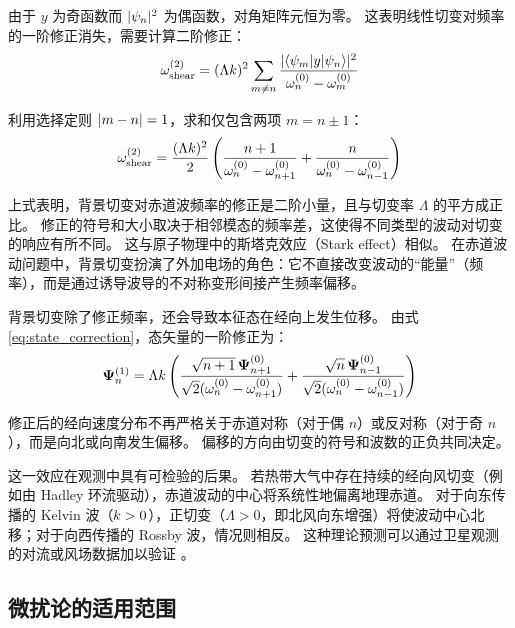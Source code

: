 由于 $y$ 为奇函数而 $\lvert \psi_{n} \rvert^2$ 为偶函数，对角矩阵元恒为零。
这表明线性切变对频率的一阶修正消失，需要计算二阶修正：
\begin{equation}
    \omega^{(2)}_{\mathrm{shear}} = (\Lambda k)^2 \sum_{m \neq n} \frac{\lvert \langle \psi_{m} | y | \psi_{n} \rangle \rvert^2}{\omega_n^{(0)} - \omega_m^{(0)}}
    \label{eq:shear_second_order}
\end{equation}

利用选择定则 $\lvert m - n \rvert = 1$，求和仅包含两项 $m = n \pm 1$：
\begin{equation}
    \omega^{(2)}_{\mathrm{shear}} = \frac{(\Lambda k)^2}{2} \left( \frac{n+1}{\omega_n^{(0)} - \omega_{n+1}^{(0)}} + \frac{n}{\omega_n^{(0)} - \omega_{n-1}^{(0)}} \right)
    \label{eq:shear_explicit}
\end{equation}

上式表明，背景切变对赤道波频率的修正是二阶小量，且与切变率 $\Lambda$ 的平方成正比。
修正的符号和大小取决于相邻模态的频率差，这使得不同类型的波动对切变的响应有所不同。
这与原子物理中的斯塔克效应（Stark effect）相似。
在赤道波动问题中，背景切变扮演了外加电场的角色：它不直接改变波动的“能量”（频率），而是通过诱导波导的不对称变形间接产生频率偏移。

背景切变除了修正频率，还会导致本征态在经向上发生位移。
由式 \eqref{eq:state_correction}，态矢量的一阶修正为：
\begin{equation}
    \bm{\Psi}_n^{(1)} = \Lambda k \left( \frac{\sqrt{n+1}\,\bm{\Psi}_{n+1}^{(0)}}{\sqrt{2}(\omega_n^{(0)} - \omega_{n+1}^{(0)})} + \frac{\sqrt{n}\,\bm{\Psi}_{n-1}^{(0)}}{\sqrt{2}(\omega_n^{(0)} - \omega_{n-1}^{(0)})} \right)
    \label{eq:shear_state_correction}
\end{equation}

修正后的经向速度分布不再严格关于赤道对称（对于偶 $n$）或反对称（对于奇 $n$），而是向北或向南发生偏移。
偏移的方向由切变的符号和波数的正负共同决定。

这一效应在观测中具有可检验的后果。
若热带大气中存在持续的经向风切变（例如由 Hadley 环流驱动），赤道波动的中心将系统性地偏离地理赤道。
对于向东传播的 Kelvin 波（$k > 0$），正切变（$\Lambda > 0$，即北风向东增强）将使波动中心北移；对于向西传播的 Rossby 波，情况则相反。
这种理论预测可以通过卫星观测的对流或风场数据加以验证 \citep{kiladisConvectivelyCoupledEquatorial2009}。

\subsection{微扰论的适用范围}
\label{subsec:validity}

